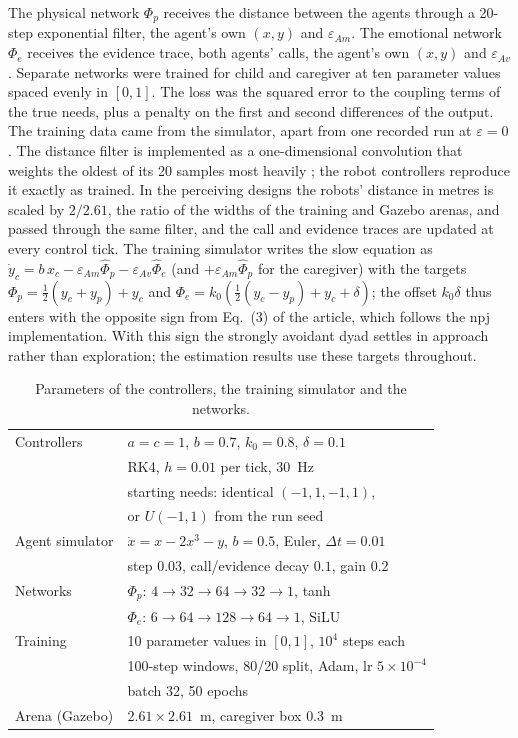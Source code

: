 \documentclass[journal]{IEEEtran}
\newif\ifdraftmarkers
\newcommand{\authornote}[1]{\ifdraftmarkers\textcolor{blue}{\textit{[Authors: #1]}}\fi}
\newcommand{\eav}{\varepsilon_{Av}}
\newcommand{\eam}{\varepsilon_{Am}}
\begin{document}
The physical network $\Phi_p$ receives the distance between the agents through a 20-step exponential filter, the agent's own $(x,y)$ and $\eam$. The emotional network $\Phi_e$ receives the evidence trace, both agents' calls, the agent's own $(x,y)$ and $\eav$. Separate networks were trained for child and caregiver at ten parameter values spaced evenly in $[0,1]$. The loss was the squared error to the coupling terms of the true needs, plus a penalty on the first and second differences of the output. The training data came from the simulator, apart from one recorded run at $\varepsilon=0$ \authornote{confirm}. The distance filter is implemented as a one-dimensional convolution that weights the oldest of its 20 samples most heavily \authornote{confirm whether this is intended}; the robot controllers reproduce it exactly as trained. In the perceiving designs the robots' distance in metres is scaled by $2/2.61$, the ratio of the widths of the training and Gazebo arenas, and passed through the same filter, and the call and evidence traces are updated at every control tick. The training simulator writes the slow equation as $\dot{y}_c=b\,x_c-\eam\hat\Phi_p-\eav\hat\Phi_e$ (and $+\eam\hat\Phi_p$ for the caregiver) with the targets $\Phi_p=\tfrac12(y_c+y_p)+y_c$ and $\Phi_e=k_0(\tfrac12(y_c-y_p)+y_c+\delta)$; the offset $k_0\delta$ thus enters with the opposite sign from Eq.~(3) of the article, which follows the npj implementation. With this sign the strongly avoidant dyad settles in approach rather than exploration; the estimation results use these targets throughout.

\begin{table}[t]
\centering
\caption{Parameters of the controllers, the training simulator and the networks.}
\label{tab:params}
\footnotesize
\begin{tabular}{@{}ll@{}}
\toprule
Controllers & $a=c=1$, $b=0.7$, $k_0=0.8$, $\delta=0.1$ \\
 & RK4, $h=0.01$ per tick, 30~Hz \\
 & starting needs: identical $(-1,1,-1,1)$, \\
 & \quad or $U(-1,1)$ from the run seed \\
Agent simulator & $\dot{x}=x-2x^3-y$, $b=0.5$, Euler, $\Delta t=0.01$ \\
 & step 0.03, call/evidence decay $0.1$, gain $0.2$ \\
Networks & $\Phi_p$: $4\!\to\!32\!\to\!64\!\to\!32\!\to\!1$, tanh \\
 & $\Phi_e$: $6\!\to\!64\!\to\!128\!\to\!64\!\to\!1$, SiLU \\
Training & 10 parameter values in $[0,1]$, $10^4$ steps each \\
 & 100-step windows, 80/20 split, Adam, lr $5\!\times\!10^{-4}$ \\
 & batch 32, 50 epochs \\
Arena (Gazebo) & $2.61\times2.61$~m, caregiver box $0.3$~m \\
\bottomrule
\end{tabular}
\end{table}
\end{document}
